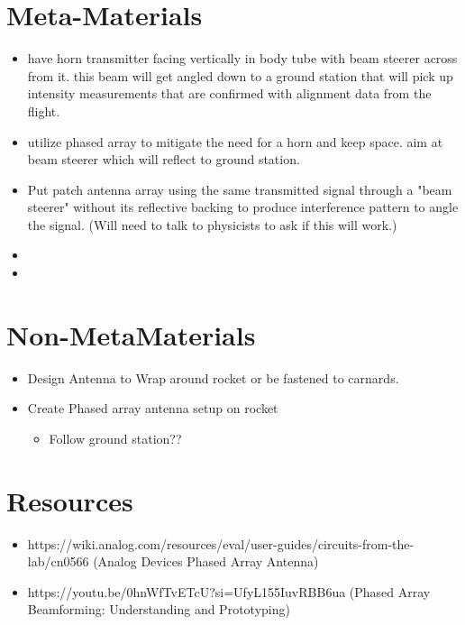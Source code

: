 \documentclass{article}
\begin{document}
	
	\section{Meta-Materials}
	\begin{itemize}
		\item have horn transmitter facing vertically in body tube with beam steerer across from it. this beam will get angled down to a ground station that will pick up intensity measurements that are confirmed with alignment data from the flight. 
		\item utilize phased array to mitigate the need for a horn and keep space. aim at beam steerer which will reflect to ground station.
		\item Put patch antenna array using the same transmitted signal through a "beam steerer" without its reflective backing to produce interference pattern to angle the signal. (Will need to talk to physicists to ask if this will work.)
		\item 
		\item 
	\end{itemize}
	
	\section{Non-MetaMaterials}	
	\begin{itemize}
		\item Design Antenna to Wrap around rocket or be fastened to carnards.
		\item Create Phased array antenna setup on rocket \begin{itemize}
			\item Follow ground station??
		\end{itemize}
		
	\end{itemize}
	
	\section{Resources}
	\begin{itemize}
		\item https://wiki.analog.com/resources/eval/user-guides/circuits-from-the-lab/cn0566 (Analog Devices Phased Array Antenna)
		\item https://youtu.be/0hnWfTvETcU?si=UfyL155IuvRBB6ua (Phased Array Beamforming: Understanding and Prototyping)
	\end{itemize}
	
	
	
	
	
\end{document}
